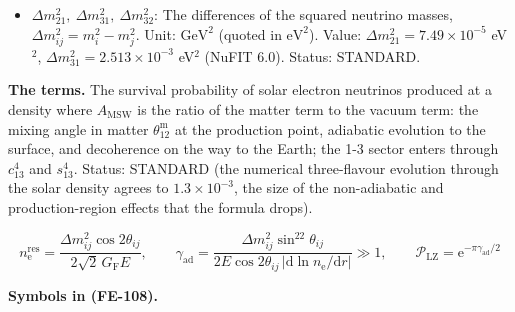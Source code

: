 \documentclass[
  10pt,
]{article}
\begin{document}
\begin{itemize}
  \(\Delta g^{MN}\) of the metric. In an uncertainty relation it is the
  spread, the root-mean-square deviation from the mean value in a state:
  \(\Delta x_0\), \(\Delta k_{x_0}\), \(\Delta\xi\), \(\Delta(fy)\) (as
  in the author's \(\Delta x_0\,\Delta p_{x_0} \ge \hbar/2\)). Status:
  STANDARD.
\item
  \(\Delta m_{21}^2,\ \Delta m_{31}^2,\ \Delta m_{32}^2\): The
  differences of the squared neutrino masses,
  \(\Delta m_{ij}^2 = m_i^2 - m_j^2\). Unit: \(\mathrm{GeV}^{2}\)
  (quoted in \(\mathrm{eV}^{2}\)). Value:
  \(\Delta m_{21}^2 = 7.49\times10^{-5}\) eV\(^2\),
  \(\Delta m_{31}^2 = 2.513\times10^{-3}\) eV\(^2\) (NuFIT 6.0). Status:
  STANDARD.
\end{itemize}

\textbf{The terms.} The survival probability of solar electron neutrinos
produced at a density where \(A_{\mathrm{MSW}}\) is the ratio of the
matter term to the vacuum term: the mixing angle in matter
\(\theta^{\mathrm{m}}_{12}\) at the production point, adiabatic
evolution to the surface, and decoherence on the way to the Earth; the
1-3 sector enters through \(c_{13}^4\) and \(s_{13}^4\). Status:
STANDARD (the numerical three-flavour evolution through the solar
density agrees to \(1.3\times10^{-3}\), the size of the non-adiabatic
and production-region effects that the formula drops).

\[
n_{\mathrm{e}}^{\mathrm{res}} = \frac{\Delta m_{ij}^2\cos2\theta_{ij}}{2\sqrt2\,G_{\mathrm{F}}E},\qquad
\gamma_{\mathrm{ad}} = \frac{\Delta m_{ij}^2\sin^22\theta_{ij}}{2E\cos2\theta_{ij}\,\lvert\mathrm{d}\ln
 n_{\mathrm{e}}/\mathrm{d}r\rvert} \gg 1,
\qquad \mathcal{P}_{\mathrm{LZ}} = \mathrm{e}^{-\pi\gamma_{\mathrm{ad}}/2} \tag{FE-108}
\]

\textbf{Symbols in (FE-108).}
\end{document}
